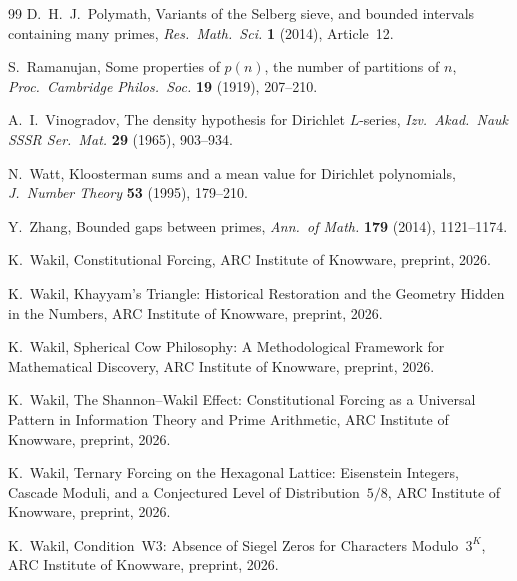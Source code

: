 \documentclass[12pt]{amsart}
\theoremstyle{plain}
\theoremstyle{definition}
\theoremstyle{remark}
\begin{document}
\begin{thebibliography}{99}
D.~H.~J.~Polymath,
Variants of the Selberg sieve, and bounded intervals containing many primes,
\emph{Res.\ Math.\ Sci.} \textbf{1} (2014), Article~12.

S.~Ramanujan,
Some properties of $p(n)$, the number of partitions of $n$,
\emph{Proc.\ Cambridge Philos.\ Soc.} \textbf{19} (1919), 207--210.

A.~I.~Vinogradov,
The density hypothesis for Dirichlet $L$-series,
\emph{Izv.\ Akad.\ Nauk SSSR Ser.\ Mat.} \textbf{29} (1965), 903--934.

N.~Watt,
Kloosterman sums and a mean value for Dirichlet polynomials,
\emph{J.\ Number Theory} \textbf{53} (1995), 179--210.

Y.~Zhang,
Bounded gaps between primes,
\emph{Ann.\ of Math.} \textbf{179} (2014), 1121--1174.


K.~Wakil,
Constitutional Forcing,
ARC Institute of Knowware, preprint, 2026.

K.~Wakil,
Khayyam's Triangle: Historical Restoration and the Geometry Hidden in the
Numbers,
ARC Institute of Knowware, preprint, 2026.

K.~Wakil,
Spherical Cow Philosophy: A Methodological Framework for Mathematical
Discovery,
ARC Institute of Knowware, preprint, 2026.

K.~Wakil,
The Shannon--Wakil Effect: Constitutional Forcing as a Universal Pattern
in Information Theory and Prime Arithmetic,
ARC Institute of Knowware, preprint, 2026.

K.~Wakil,
Ternary Forcing on the Hexagonal Lattice: Eisenstein Integers, Cascade
Moduli, and a Conjectured Level of Distribution~$5/8$,
ARC Institute of Knowware, preprint, 2026.

K.~Wakil,
Condition~W3: Absence of Siegel Zeros for Characters Modulo~$3^K$,
ARC Institute of Knowware, preprint, 2026.

\end{thebibliography}
\end{document}
